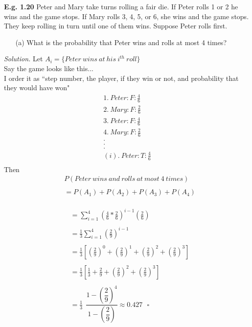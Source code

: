 \documentclass[12pt]{book}
\begin{document}
\noindent \textbf{E.g. 1.20} Peter and Mary take turns rolling a fair die. If Peter rolls 1 or 2 he wins and the game stops. If Mary rolls 3, 4, 5, or 6, she wins and the game stops. They keep rolling in turn until one of them wins. Suppose Peter rolls first.
\begin{itemize}\item [(a)] What is the probability that Peter wins and rolls at most 4 times?\end{itemize}
\newpage \textit{Solution.} 
Let $A_i=\{Peter~wins~at~his~i^{th}~roll\}$\\
Say the game looks like this...\\
I order it as ``step number, the player, if they win or not, and probability that they would have won"\\
$$\begin{aligned}
1.~Peter : F : \frac{4}{6}\\
2.~Mary : F : \frac{2}{6}\\
3.~Peter : F : \frac{4}{6}\\
4.~Mary : F : \frac{2}{6}\\
.\\
.\\
.\\
(i).~Peter : T : \frac{4}{6}\\
\end{aligned} $$
Then 
\begin{align*}
&P(Peter~wins~and~rolls~at~most~4~times)\\\\
&=P(A_{1}) + P(A_{2}) + P(A_{3}) + P(A_{4}) \\\\
\end{align*}
\begin{align*}
\\&=\displaystyle\sum\limits_{i=1}^{4} \left(\frac{4}{6}* \frac{2}{6}\right)^{i-1} \left(\frac{2}{6}\right)\\\\
&=\frac{1}{3}\sum\limits_{i=1}^{4} \left(\frac{2}{9}\right)^{i-1}\\\\
&=\frac{1}{3} \left[ \left(\frac{2}{9}\right)^{0} + \left(\frac{2}{9}\right)^{1}+ \left(\frac{2}{9}\right)^{2} + \left(\frac{2}{9}\right)^{3} \right] \\\\
&=\frac{1}{3} \left[ \frac{1}{3} + \frac{2}{9} + \left(\frac{2}{9}\right)^{2} + \left(\frac{2}{9}\right)^{3} \right] \\\\
&=\frac{1}{3} ~~\dfrac{1-\left(\dfrac{2}{9}\right)^{4}}{1-\left(\dfrac{2}{9}\right)} \approx 0.427~~~\square
\end{align*}
\end{document}
